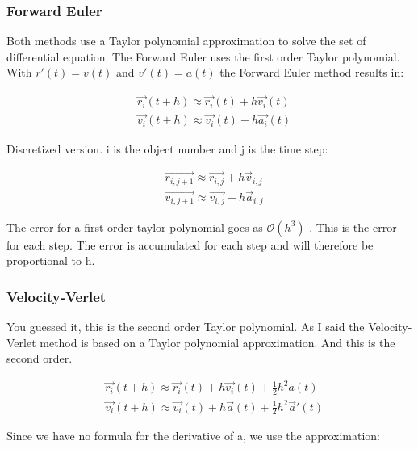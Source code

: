 \subsubsection{Forward Euler}

Both methods use a Taylor polynomial approximation to solve the set of differential equation. The Forward Euler uses the first order Taylor polynomial. With $r'(t) = v(t)$ and $v'(t) = a(t)$ the Forward Euler method results in: 
 
\begin{align}
	&\vec{r_i}(t+h) \approx \vec{r_i}(t) + h \vec{v_i}(t)
	\\
	&\vec{v_i}(t+h) \approx \vec{v_i}(t) + h \vec{a_i}(t)
\end{align}

Discretized version. i is the object number and j is the time step:

\begin{align*}
	&\vec{r_{i,j+1}} \approx \vec{r_{i,j}} + h \vec{v}_{i,j}
	\\
	&\vec{v_{i,j+1}} \approx \vec{v_{i,j}} + h \vec{a}_{i,j}
\end{align*}

The error for a first order taylor polynomial goes as $\mathcal{O}(h^3)$ \cite{compphys}. This is the error for each step. The error is accumulated for each step and will therefore be proportional to h. 













\subsubsection{Velocity-Verlet}

You guessed it, this is the second order Taylor polynomial. As I said the Velocity-Verlet method is based on a Taylor polynomial approximation. And this is the second order. 

\begin{align}
	&\vec{r_i}(t+h) \approx \vec{r_i}(t) + h \vec{v_i}(t) + \frac{1}{2} h^2 a(t)
	\\
	&\vec{v_i}(t+h) \approx \vec{v_i}(t) + h \vec{a}(t) + \frac{1}{2} h^2 \vec{a}'(t)
	\label{eq:verlet}
\end{align}

Since we have no formula for the derivative of a, we use the approximation: 

